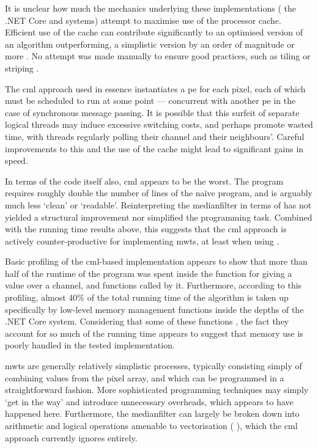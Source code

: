 It is unclear how much the mechanics underlying these implementations (\ie{} the .NET Core and \hopac{} systems) attempt to maximise use of the processor cache.  Efficient use of the cache can contribute significantly to an optimised version of an algorithm outperforming, a simplistic version by an order of magnitude or more \cite{Ragan-Kelley2017}.  No attempt was made manually to ensure good practices, such as tiling or striping \cite{Midkiff2012}.

The \gls{cml} approach used in essence instantiates a \gls{pe} for each pixel, each of which must be scheduled to run at some point --- concurrent with another \gls{pe} in the case of synchronous message passing.  It is possible that this surfeit of separate logical threads may induce excessive switching costs, and perhaps promote wasted time, with threads regularly polling their channel and their neighbours'.  Careful improvements to this and the use of the cache might lead to significant gains in speed.

In terms of the code itself also, \gls{cml} appears to be the worst.  The program requires roughly double the number of lines of the naïve program, and is arguably much less `clean' or `readable'.  Reinterpreting the \gls{medianfilter} in terms of  has not yielded a structural improvement nor simplified the programming task.  Combined with the running time results above, this suggests that the \gls{cml} approach is actively counter-productive for implementing \glspl{mwt}, at least when using \hopac{}.

Basic profiling of the \gls{cml}-based implementation appears to show that more than half of the runtime of the program was spent inside the function for giving a value over a channel, and functions called by it.  Furthermore, according to this profiling, almost 40\% of the total running time of the algorithm is taken up specifically by low-level memory management functions inside the depths of the .NET Core system.  Considering that some of these functions , the fact they account for so much of the running time appears to suggest that memory use is poorly handled in the tested implementation.

\Glspl{mwt} are generally relatively simplistic processes, typically consisting simply of combining values from the pixel array, and which can be programmed in a straightforward fashion.  More sophisticated programming techniques may simply `get in the way' and introduce unnecessary overheads, which appears to have happened here.  Furthermore, the \gls{medianfilter} can largely be broken down into arithmetic and logical operations amenable to vectorisation (\eg{} \cite{Sanchez2012,Perreault2007}), which the \gls{cml} approach currently ignores entirely.

